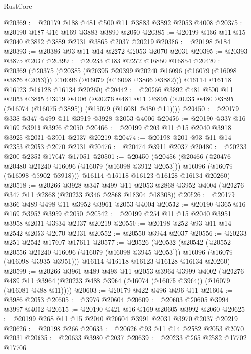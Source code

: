 \begin{lexlean}{RustCore}
\begin{coremodule}
@20369 := @20179 @188 @481 @500 @11 @3883 @3892 @2053 @4008
@20375 := @20190 @187 @16 @169 @3883 @3890 @2060
@20385 := @20199 @186 @11 @15 @2040 @3882 @3889 @2031 @3865 @2037 @20219
@20386 := @20198 @184
@20393 := @20386 @93 @11 @14 @2272 @2053 @2070 @2031
@20395 := @20393 @3875 @2037
@20399 := @20233 @183 @2272 @16850 @16854
@20420 := @20369
    (@20375
      (@20385
        (@20395 @20399 @20240 @16096 (@16079 (@16098 @3876 @2053)))
        @16096
        (@16079 (@16098 @3866 @3882)))
      @16114
      @16118
      @16123
      @16128
      @16134
      @20260)
@20442 := @20266
    @3892
    @481
    @500
    @11
    @2053
    @3895
    @3919
    @4006
    (@20276 @481 @11 @3895 (@20233 @480 @3895 (@16074 (@16075 @3895)) (@16079 (@16081 @480 @11))))
@20450 := @20179 @338 @347 @499 @11 @3919 @3928 @2053 @4006
@20456 := @20190 @337 @16 @169 @3919 @3926 @2060
@20466 := @20199 @203 @11 @15 @2040 @3918 @3925 @2031 @3901 @2037 @20219
@20474 := @20198 @201 @93 @11 @14 @2353 @2053 @2070 @2031
@20476 := @20474 @3911 @2037
@20480 := @20233 @200 @2353 @17047 @17051
@20501 := @20450
    (@20456
      (@20466
        (@20476 @20480 @20240 @16096 (@16079 (@16098 @3912 @2053)))
        @16096
        (@16079 (@16098 @3902 @3918)))
      @16114
      @16118
      @16123
      @16128
      @16134
      @20260)
@20518 := @20266
    @3928
    @347
    @499
    @11
    @2053
    @2868
    @3952
    @4004
    (@20276 @347 @11 @2868 (@20233 @346 @2868 @18304 @18308))
@20526 := @20179 @366 @489 @498 @11 @3952 @3961 @2053 @4004
@20532 := @20190 @365 @16 @169 @3952 @3959 @2060
@20542 := @20199 @254 @11 @15 @2040 @3951 @3958 @2031 @3934 @2037 @20219
@20550 := @20198 @252 @93 @11 @14 @2542 @2053 @2070 @2031
@20552 := @20550 @3944 @2037
@20556 := @20233 @251 @2542 @17607 @17611
@20577 := @20526
    (@20532
      (@20542
        (@20552 @20556 @20240 @16096 (@16079 (@16098 @3945 @2053)))
        @16096
        (@16079 (@16098 @3935 @3951)))
      @16114
      @16118
      @16123
      @16128
      @16134
      @20260)
@20599 := @20266
    @3961
    @489
    @498
    @11
    @2053
    @3964
    @3999
    @4002
    (@20276 @489 @11 @3964 (@20233 @488 @3964 (@16074 (@16075 @3964)) (@16079 (@16081 @488 @11))))
@20603 := @20179 @422 @496 @496 @11
@20604 := @3986 @2053
@20605 := @3976 @20604
@20609 := @20603 @20605 @3994 @3997 @4002
@20615 := @20190 @421 @16 @169 @20605 @3992 @2060
@20625 := @20199 @268 @11 @15 @2040 @20604 @3991 @2031 @3970 @2037 @20219
@20626 := @20198 @266
@20633 := @20626 @93 @11 @14 @2582 @2053 @2070 @2031
@20635 := @20633 @3980 @2037
@20639 := @20233 @265 @2582 @17702 @17706

\end{coremodule}
\end{lexlean}
